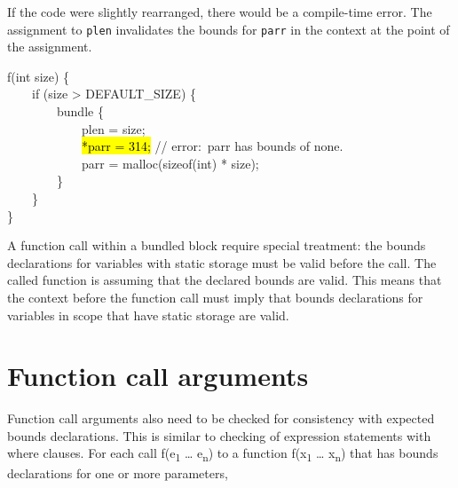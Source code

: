 If the code were slightly rearranged, there would be a compile-time
error. The assignment to \texttt{plen} invalidates the bounds for
\texttt{parr} in the context at the point of the assignment.

\begin{tt}
f(int size) \{\\
\mbox{~~~~}if (size > DEFAULT\_SIZE) \{\\
\mbox{~~~~~~~~}bundle \{\\
\mbox{~~~~~~~~~~~~}plen = size;\\
\mbox{~~~~~~~~~~~~}\hl{*parr = 314;} // error:~parr has bounds of none.\\
\mbox{~~~~~~~~~~~~}parr = malloc(sizeof(int) * size);\\
\mbox{~~~~~~~~}\}\\
\mbox{~~~~}\}\\
\}
\end{tt}

A function call within a bundled block require special treatment: the
bounds declarations for variables with static storage must be valid
before the call. The called function is assuming that the declared
bounds are valid. This means that the context before the function call
must imply that bounds declarations for variables in scope that have
static storage are valid.

\section{Function call arguments}
\label{section:checking-function-call-arguments}

Function call arguments also need to be checked for consistency with
expected bounds declarations. This is similar to checking of expression
statements with where clauses. For each call f(e\textsubscript{1}
\ldots{} e\textsubscript{n}) to a function f(x\textsubscript{1} \ldots{}
x\textsubscript{n}) that has bounds declarations for one or more
parameters,


